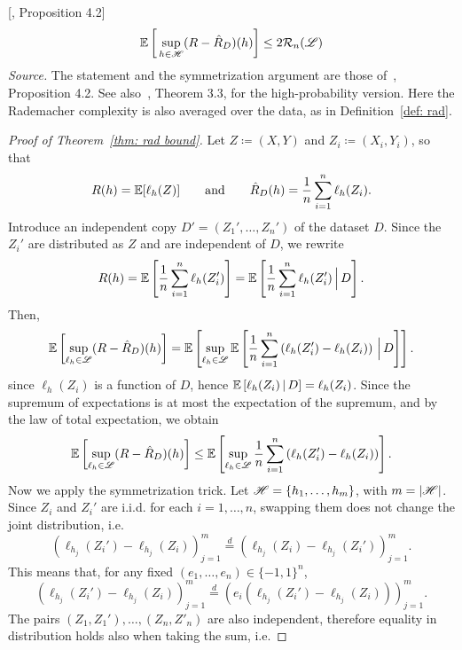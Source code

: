 \documentclass[reqno]{amsart}
\begin{document}
\begin{theorem}\label{thm: rad bound} [\cite{bach2024learning}, Proposition 4.2]
\[
\mathbb{E}\left[\,\sup_{h \in \mathscr{H}}(R - \hat R_D)(h)\right]
\le 2 \mathcal R_n(\mathscr{L})
\]
\textnormal{\emph{Source.} The statement and the symmetrization argument are those of~\cite{bach2024learning}, Proposition 4.2. See also~\cite{mohri2018foundations}, Theorem 3.3, for the high-probability version. Here the Rademacher complexity is also averaged over the data, as in Definition~\ref{def: rad}.}

\begin{proof}[Proof of Theorem~\ref{thm: rad bound}]
Let $Z\coloneq(X,Y)$ and $Z_i\coloneq(X_i,Y_i)$, so that
\[
R(h) = \mathbb{E}[\ell_h(Z)] \qquad \text{and} \qquad \hat R_D(h) = \frac1n\sum_{i=1}^n \ell_h(Z_i).
\]
Introduce an independent copy $D'=(Z_1',\ldots,Z_n')$ of the dataset $D$.
Since the $Z_i'$ are distributed as $Z$ and are independent of $D$, we rewrite
\[
R(h) = \mathbb{E}\left[\frac1n\sum_{i=1}^n \ell_h(Z_i')\right] = \mathbb{E}\left[\frac1n\sum_{i=1}^n \ell_h(Z_i')\,\Big\vert\, D\right].
\]
Then,
\[
\mathbb{E}\left[\sup_{\ell_h\in\mathscr{L}}(R-\hat R_D)(h)\right] = \mathbb{E}\left[\sup_{\ell_h\in\mathscr{L}} \mathbb{E}\left[\frac1n\sum_{i=1}^n \left(\ell_h(Z_i')-\ell_h(Z_i)\right)\,\Big\vert\, D\right]\right].
\]
since $\ell_h(Z_i)$ is a function of $D$, hence $\mathbb{E}\left[\ell_h(Z_i)\,\vert\, D\right] = \ell_h(Z_i)$.
Since the supremum of expectations is at most the expectation of the supremum, and by the law of total expectation, we obtain
\begin{equation}\label{app/eq: sym step1}
\mathbb{E}\left[\sup_{\ell_h\in\mathscr{L}}(R-\hat R_D)(h)\right] \le \mathbb{E}\left[\sup_{\ell_h\in\mathscr{L}}\frac1n\sum_{i=1}^n \left(\ell_h(Z_i')-\ell_h(Z_i)\right)\right].
\end{equation}
Now we apply the symmetrization trick. Let $\mathscr{H} = \{h_1,\ldots,h_m\}$, with $m = \vert\mathscr{H}\vert$. Since $Z_i$ and $Z_i'$ are i.i.d. for each $i=1,\ldots,n$, swapping them does not change the joint distribution, i.e.
\[
\left(\ell_{h_j}(Z_i')-\ell_{h_j}(Z_i)\right)_{j=1}^m \overset{d}{=} \left(\ell_{h_j}(Z_i)-\ell_{h_j}(Z_i')\right)_{j=1}^m.
\]
This means that, for any fixed $(e_1,\ldots,e_n)\in\{-1,1\}^n$,
\[
\left(\ell_{h_j}(Z_i')-\ell_{h_j}(Z_i)\right)_{j=1}^m \overset{d}{=} \left(e_i\left(\ell_{h_j}(Z_i')-\ell_{h_j}(Z_i)\right)\right)_{j=1}^m.
\]
The pairs $(Z_1,Z_1'),\ldots,(Z_n,Z'_n)$ are also independent, therefore equality in distribution holds also when taking the sum, i.e.

\end{proof}
\end{theorem}
\end{document}
